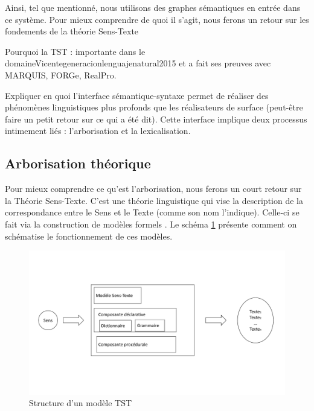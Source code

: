 Ainsi, tel que mentionné, nous utilisons des graphes sémantiques en entrée dans ce système. Pour mieux comprendre de quoi il s'agit, nous ferons un retour sur les fondements de la théorie Sens-Texte

Pourquoi la TST : importante dans le domaine{Vicentegeneracionlenguajenatural2015} et a fait ses preuves avec MARQUIS, FORGe, RealPro.

Expliquer en quoi l'interface sémantique-syntaxe permet de réaliser des phénomènes linguistiques plus profonds que les réalisateurs de surface (peut-être faire un petit retour sur ce qui a été dit). Cette interface implique deux processus intimement liés : l'arborisation et la lexicalisation. 


\subsection{Arborisation théorique}\label{arbo}
Pour mieux comprendre ce qu'est l'arborisation, nous ferons un court retour sur la Théorie Sens-Texte. C'est une théorie linguistique qui vise la description de la correspondance entre le Sens et le Texte (comme son nom l'indique). Celle-ci se fait via la construction de modèles formels \citep{PolgueretheorieSensTexte1998}. Le schéma \ref{fig:modeletst} présente comment on schématise le fonctionnement de ces modèles.

\begin{figure}[htb]
	\centering
	\includegraphics[width=1\textwidth, trim = {0cm 3cm 0cm 3cm},clip]{ch3/figs/polguere1.pdf}
	\caption{Structure d'un modèle TST}
	\label{fig:modeletst}
\end{figure}

